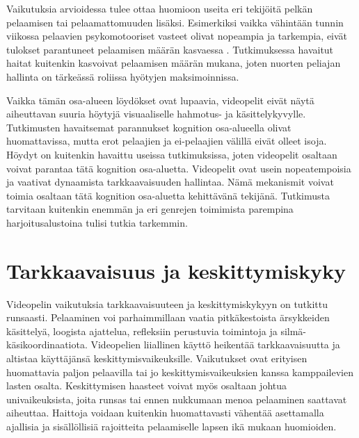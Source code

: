 \documentclass[utf8,bachelor]{gradu3}
\begin{document}
Vaikutuksia arvioidessa tulee ottaa huomioon useita eri tekijöitä pelkän pelaamisen tai pelaamattomuuden lisäksi. Esimerkiksi vaikka vähintään tunnin viikossa pelaavien psykomotooriset vasteet olivat nopeampia ja tarkempia, eivät tulokset parantuneet pelaamisen määrän kasvaessa \parencite{pujol2016video}. Tutkimuksessa havaitut haitat kuitenkin kasvoivat pelaamisen määrän mukana, joten nuorten peliajan hallinta on tärkeässä roliissa hyötyjen maksimoinnissa. 

Vaikka tämän osa-alueen löydökset ovat lupaavia, videopelit eivät näytä aiheuttavan suuria höytyjä visuaaliselle hahmotus- ja käsittelykyvylle. Tutkimusten havaitsemat parannukset kognition osa-alueella olivat huomattavissa, mutta erot pelaajien ja ei-pelaajien välillä eivät olleet isoja. Höydyt on kuitenkin havaittu useissa tutkimuksissa, joten videopelit osaltaan voivat parantaa tätä kognition osa-aluetta. Videopelit ovat usein nopeatempoisia ja vaativat dynaamista tarkkaavaisuuden hallintaa. Nämä mekanismit voivat toimia osaltaan tätä kognition osa-aluetta kehittävänä tekijänä. Tutkimusta tarvitaan kuitenkin enemmän ja eri genrejen toimimista parempina harjoitusalustoina tulisi tutkia tarkemmin.  

\section{Tarkkaavaisuus ja keskittymiskyky}

Videopelin vaikutuksia tarkkaavaisuuteen ja keskittymiskykyyn on tutkittu runsaasti. Pelaaminen voi parhaimmillaan vaatia pitkäkestoista ärsykkeiden käsittelyä, loogista ajattelua, refleksiin perustuvia toimintoja ja silmä-käsikoordinaatiota. Videopelien liiallinen käyttö heikentää tarkkaavaisuutta ja altistaa käyttäjänsä keskittymisvaikeuksille. Vaikutukset ovat erityisen huomattavia paljon pelaavilla tai jo keskittymisvaikeuksien kanssa kamppailevien lasten osalta. Keskittymisen haasteet voivat myös osaltaan johtua univaikeuksista, joita runsas tai ennen nukkumaan menoa pelaaminen saattavat aiheuttaa. Haittoja voidaan kuitenkin huomattavasti vähentää asettamalla ajallisia ja sisällöllisiä rajoitteita pelaamiselle lapsen ikä mukaan huomioiden. \parencite{lerida2022internet} 
\end{document}

